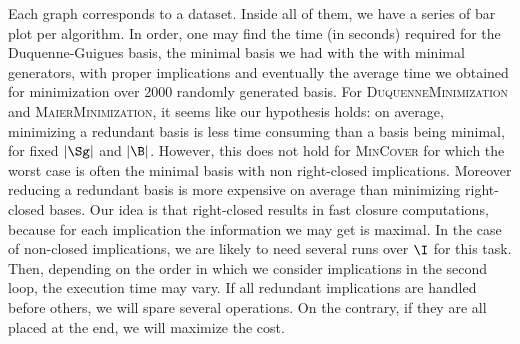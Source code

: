\begin{figure}[ht]
	
\end{figure}

\vspace{1.2em}

Each graph corresponds to a dataset. Inside all of them, we have a series
of bar plot per algorithm. In order, one may find the time (in seconds) required for the Duquenne-Guigues basis, the minimal basis we had with the
with minimal generators, with proper implications and eventually the average
time we obtained for minimization over 2000 randomly generated basis. For \textsc{DuquenneMinimization} and \textsc{MaierMinimization}, it seems like
our hypothesis holds: on average, minimizing a redundant basis is less time consuming than a basis being minimal, for fixed $|\Sg|$ and $|\B|$. However,
this does not hold for \textsc{MinCover} for which the worst case is often
the minimal basis with non right-closed implications. Moreover reducing a redundant basis is more expensive on average than minimizing right-closed
bases. Our idea is that right-closed results in fast closure computations, because for each implication the information we may get is maximal. In the
case of non-closed implications, we are likely to need several runs over
$\I$ for this task. Then, depending on the order in which we consider implications in the second loop, the execution time may vary. If all redundant
implications are handled before others, we will spare several operations.
On the contrary, if they are all placed at the end, we will maximize the
cost.


\vspace{1.2em}

